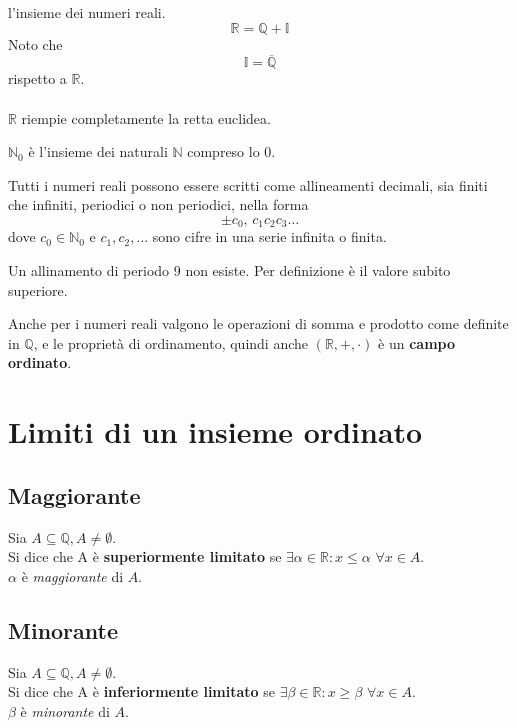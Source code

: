 \documentclass[a4paper,12pt, oneside]{book}
\begin{document}
l'insieme dei numeri reali.
\begin{equation} \mathbb{R} = \mathbb{Q} + \mathbb{I}
\end{equation} Noto che
\begin{equation} \mathbb{I} = \overline{\mathbb{Q}}
\end{equation} rispetto a $\mathbb{R}$.\\\\ $\mathbb{R}$ riempie completamente
la retta euclidea.
\begin{shaded}
  \begin{nota} $\mathbb{N}_0$ è l'insieme dei naturali $\mathbb{N}$ compreso lo
    0.
  \end{nota}
\end{shaded} Tutti i numeri reali possono essere scritti come allineamenti
decimali, sia finiti che infiniti, periodici o non periodici, nella forma
$$\pm c_0,\,c_1c_2c_3\dots$$
dove $c_0\in\mathbb{N}_0$ e $c_1,c_2,\dots$ sono cifre in una serie infinita o
finita.
\begin{shaded}
  \begin{nota} Un allinamento di periodo 9 non esiste. Per definizione è il
    valore subito superiore.
  \end{nota}
\end{shaded} Anche per i numeri reali valgono le operazioni di somma e prodotto
come definite in $\mathbb{Q}$, e le proprietà di ordinamento, quindi anche
$(\mathbb{R},+,\cdot)$ è un \textbf{campo ordinato}.
\section{Limiti di un insieme ordinato}
\subsection{Maggiorante}
\begin{definizione} Sia $A \subseteq \mathbb{Q}, A \neq \emptyset$.\\ Si dice
  che A è \textbf{superiormente limitato} se $\exists\alpha\in\mathbb{R}\colon
  x\leq\alpha$ $\forall x\in A$.\\ $\alpha$ è \emph{maggiorante} di $A$.
\end{definizione}
\subsection{Minorante}
\begin{definizione} Sia $A \subseteq \mathbb{Q}, A \neq \emptyset$.\\ Si dice
  che A è \textbf{inferiormente limitato} se $\exists\beta\in\mathbb{R}\colon
  x\geq\beta$ $\forall x\in A$.\\ $\beta$ è \emph{minorante} di $A$.
\end{definizione}
\end{document}
